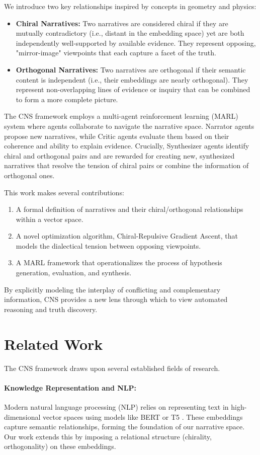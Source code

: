 \documentclass[12pt, a4paper]{article}
\begin{document}
We introduce two key relationships inspired by concepts in geometry and physics:
\begin{itemize}
    \item \textbf{Chiral Narratives:} Two narratives are considered chiral if they are mutually contradictory (i.e., distant in the embedding space) yet are both independently well-supported by available evidence. They represent opposing, "mirror-image" viewpoints that each capture a facet of the truth.
    \item \textbf{Orthogonal Narratives:} Two narratives are orthogonal if their semantic content is independent (i.e., their embeddings are nearly orthogonal). They represent non-overlapping lines of evidence or inquiry that can be combined to form a more complete picture.
\end{itemize}

The CNS framework employs a multi-agent reinforcement learning (MARL) system \cite{Busoniu2008MARL} where agents collaborate to navigate the narrative space. Narrator agents propose new narratives, while Critic agents evaluate them based on their coherence and ability to explain evidence. Crucially, Synthesizer agents identify chiral and orthogonal pairs and are rewarded for creating new, synthesized narratives that resolve the tension of chiral pairs or combine the information of orthogonal ones.

This work makes several contributions:
\begin{enumerate}
    \item A formal definition of narratives and their chiral/orthogonal relationships within a vector space.
    \item A novel optimization algorithm, Chiral-Repulsive Gradient Ascent, that models the dialectical tension between opposing viewpoints.
    \item A MARL framework that operationalizes the process of hypothesis generation, evaluation, and synthesis.
\end{enumerate}
By explicitly modeling the interplay of conflicting and complementary information, CNS provides a new lens through which to view automated reasoning and truth discovery.

\section{Related Work}

The CNS framework draws upon several established fields of research.
\paragraph{Knowledge Representation and NLP:} Modern natural language processing (NLP) relies on representing text in high-dimensional vector spaces using models like BERT \cite{Devlin2019BERT} or T5 \cite{Raffel2020T5}. These embeddings capture semantic relationships, forming the foundation of our narrative space. Our work extends this by imposing a relational structure (chirality, orthogonality) on these embeddings.
\end{document}
